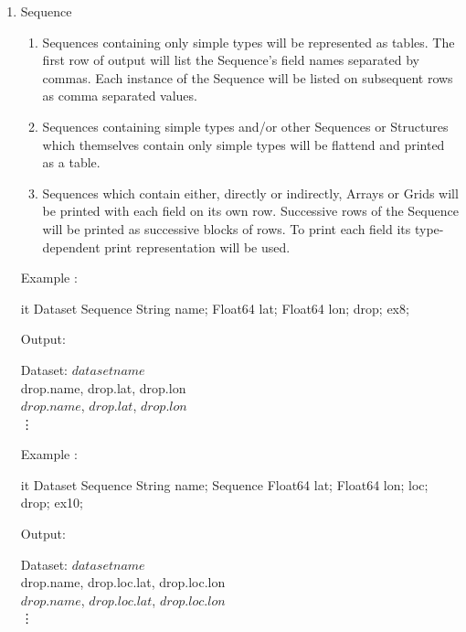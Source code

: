 \documentclass{article}
\begin{document}
\begin{enumerate}
\item Sequence
\begin{enumerate}
\item Sequences containing only simple types will be represented as tables.
  The first row of output will list the Sequence's field names separated by
  commas. Each instance of the Sequence will be listed on subsequent rows as
  comma separated values.
\item Sequences containing simple types and/or other Sequences or Structures
  which themselves contain only simple types will be flattend and printed as
  a table.
\item Sequences which contain either, directly or indirectly, Arrays or Grids
  will be printed with each field on its own row. Successive rows of the
  Sequence will be printed as successive blocks of rows. To print each field
  its type-dependent print representation will be used. 
\end{enumerate}

\T\begin{minipage}{5in}
Example :
\T\medskip

\begin{vcode}{it}
Dataset {
  Sequence {
    String name;
    Float64 lat;
    Float64 lon;
  } drop;
} ex8;
\end{vcode}
\T\medskip

Output:\\
\begin{ttfamily}
Dataset: $dataset name$\\
drop.name, drop.lat, drop.lon\\
$drop.name$, $drop.lat$, $drop.lon$\\
\vdots
\end{ttfamily}
\T\end{minipage}
\T\bigskip

\T\begin{minipage}{5in}
Example :
\T\medskip

\begin{vcode}{it}
Dataset {
  Sequence {
    String name;
    Sequence {
      Float64 lat;
      Float64 lon;
    } loc;
  } drop;
} ex10;
\end{vcode}
\T\medskip

Output:\\
\begin{ttfamily}
Dataset: $dataset name$\\
drop.name, drop.loc.lat, drop.loc.lon\\
$drop.name$, $drop.loc.lat$, $drop.loc.lon$\\
\vdots
\end{ttfamily}
\T\end{minipage}
\T\bigskip


\end{enumerate}
\end{document}
